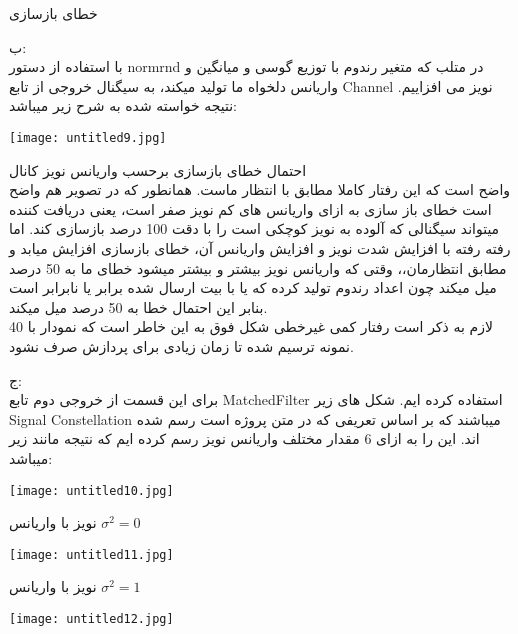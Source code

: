 \centering
خطای بازسازی


\raggedleft
ب:
\\
با استفاده از دستور normrnd در متلب که متغیر رندوم با توزیع گوسی و میانگین و واریانس دلخواه ما تولید میکند، به سیگنال خروجی از تابع Channel نویز می افزاییم. نتیجه خواسته شده به شرح زیر میباشد:


\begin{center}
    \texttt{[image: untitled9.jpg]}
\end{center}

\centering
احتمال خطای بازسازی برحسب واریانس نویز کانال
\\[0.5cm]
\raggedleft
\justify
واضح است که این رفتار کاملا مطابق با انتظار ماست. همانطور که در تصویر هم واضح است خطای باز سازی به ازای واریانس های کم نویز صفر است، یعنی دریافت کننده میتواند سیگنالی که آلوده به نویز کوچکی است را با دقت 100 درصد بازسازی کند. اما رفته رفته با افزایش شدت نویز و افزایش واریانس آن، خطای بازسازی افزایش میابد و مطابق انتظارمان،، وقتی که واریانس نویز بیشتر و بیشتر میشود خطای ما به 50 درصد میل میکند چون اعداد رندوم تولید کرده که یا با بیت ارسال شده برابر یا نابرابر است بنابر این احتمال خطا به 50 درصد میل میکند.
\\
لازم به ذکر است رفتار کمی غیرخطی شکل فوق به این خاطر است که نمودار با 40 نمونه ترسیم شده تا زمان زیادی برای پردازش صرف نشود.

\raggedleft

ج:
\\
برای این قسمت از خروجی دوم تابع MatchedFilter استفاده کرده ایم. شکل های زیر Signal Constellation میباشند که بر اساس تعریفی که در متن پروژه است رسم شده اند. این را به ازای 6 مقدار مختلف واریانس نویز رسم کرده ایم که نتیجه مانند زیر میباشد:
\\
\begin{center}
    \texttt{[image: untitled10.jpg]}
\end{center}

\centering
نویز با واریانس ${\sigma}^2 = 0$
\\[1cm]


\begin{center}
    \texttt{[image: untitled11.jpg]}
\end{center}

\centering
نویز با واریانس ${\sigma}^2 = 1$
\\[0.5cm]


\begin{center}
    \texttt{[image: untitled12.jpg]}
\end{center}

